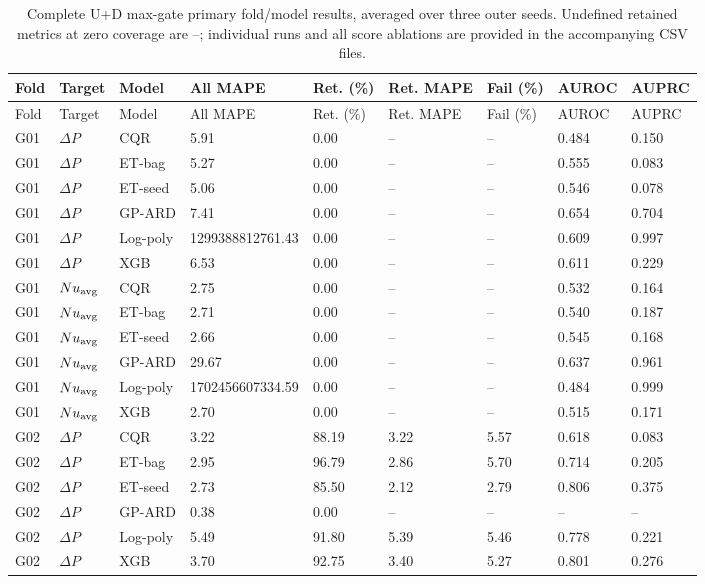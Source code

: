\scriptsize\begin{longtable}{lllllllll}
\caption{Complete U+D max-gate primary fold/model results, averaged over three outer seeds. Undefined retained metrics at zero coverage are --; individual runs and all score ablations are provided in the accompanying CSV files.}\label{tab:full}\\
\toprule
Fold & Target & Model & All MAPE & Ret. (\%) & Ret. MAPE & Fail (\%) & AUROC & AUPRC\\\midrule\endfirsthead
Fold & Target & Model & All MAPE & Ret. (\%) & Ret. MAPE & Fail (\%) & AUROC & AUPRC\\\midrule\endhead
G01 & $\Delta P$ & CQR & 5.91 & 0.00 & -- & -- & 0.484 & 0.150\\
G01 & $\Delta P$ & ET-bag & 5.27 & 0.00 & -- & -- & 0.555 & 0.083\\
G01 & $\Delta P$ & ET-seed & 5.06 & 0.00 & -- & -- & 0.546 & 0.078\\
G01 & $\Delta P$ & GP-ARD & 7.41 & 0.00 & -- & -- & 0.654 & 0.704\\
G01 & $\Delta P$ & Log-poly & 1299388812761.43 & 0.00 & -- & -- & 0.609 & 0.997\\
G01 & $\Delta P$ & XGB & 6.53 & 0.00 & -- & -- & 0.611 & 0.229\\
G01 & $Nu_{\rm avg}$ & CQR & 2.75 & 0.00 & -- & -- & 0.532 & 0.164\\
G01 & $Nu_{\rm avg}$ & ET-bag & 2.71 & 0.00 & -- & -- & 0.540 & 0.187\\
G01 & $Nu_{\rm avg}$ & ET-seed & 2.66 & 0.00 & -- & -- & 0.545 & 0.168\\
G01 & $Nu_{\rm avg}$ & GP-ARD & 29.67 & 0.00 & -- & -- & 0.637 & 0.961\\
G01 & $Nu_{\rm avg}$ & Log-poly & 1702456607334.59 & 0.00 & -- & -- & 0.484 & 0.999\\
G01 & $Nu_{\rm avg}$ & XGB & 2.70 & 0.00 & -- & -- & 0.515 & 0.171\\
G02 & $\Delta P$ & CQR & 3.22 & 88.19 & 3.22 & 5.57 & 0.618 & 0.083\\
G02 & $\Delta P$ & ET-bag & 2.95 & 96.79 & 2.86 & 5.70 & 0.714 & 0.205\\
G02 & $\Delta P$ & ET-seed & 2.73 & 85.50 & 2.12 & 2.79 & 0.806 & 0.375\\
G02 & $\Delta P$ & GP-ARD & 0.38 & 0.00 & -- & -- & -- & --\\
G02 & $\Delta P$ & Log-poly & 5.49 & 91.80 & 5.39 & 5.46 & 0.778 & 0.221\\
G02 & $\Delta P$ & XGB & 3.70 & 92.75 & 3.40 & 5.27 & 0.801 & 0.276\\

\end{longtable}

